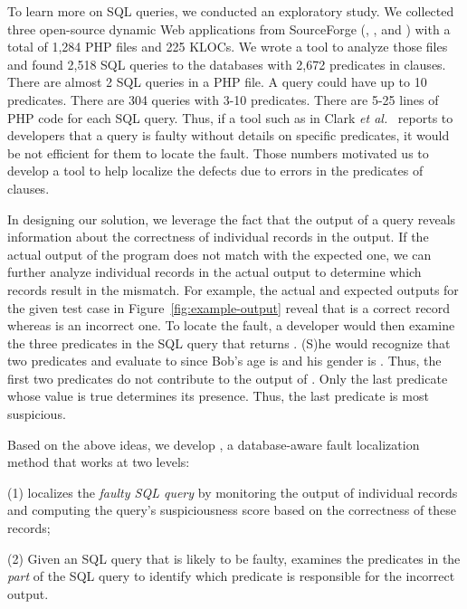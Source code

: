 To learn more on SQL queries, we conducted an exploratory study. We
collected three open-source dynamic Web applications from SourceForge
(, , and ) with a
total of 1,284 PHP files and 225 KLOCs. We wrote a tool to analyze
those files and found 2,518 SQL queries to the databases with 2,672
predicates in  clauses. There are almost 2 SQL queries in
a PHP file. A query could have up to 10 predicates. There are 304
queries with 3-10 predicates. There are 5-25 lines of PHP code for
each SQL query. Thus, if a tool such as in Clark {\em et
al.}~\cite{ga-ase11} reports to developers that a query is faulty
without details on specific predicates, it would be not efficient for
them to locate the fault. Those numbers motivated us to develop a tool
to help localize the defects due to errors in the predicates of
 clauses.

In designing our solution, we leverage the fact that the output of a
query reveals information about the correctness of individual records
in the output. If the actual output of the program does not match with
the expected one, we can further analyze individual records in the
actual output to determine which records result in the mismatch. For
example, the actual and expected outputs for the given test case in
Figure~\ref{fig:example-output} reveal that  is a correct
record whereas  is an incorrect one. To locate the fault,
a developer would then examine the three predicates in the SQL query
that returns . (S)he would recognize that two
predicates  and  evaluate to
 since Bob's age is  and his gender is
. Thus, the first two predicates do not contribute to the
output of . Only the last predicate whose value is true
determines its presence. Thus, the last predicate is most suspicious.



Based on the above ideas, we develop {\tool}, a database-aware fault
localization method that works at two levels:

(1) \tool{} localizes the {\em faulty SQL query} by monitoring the
output of individual records and computing the query's suspiciousness
score based on the correctness of these records;

(2) Given an SQL query that is likely to be faulty, \tool{} examines
the predicates in the {\em {} part} of the SQL query to
identify which predicate is responsible for the incorrect output.

